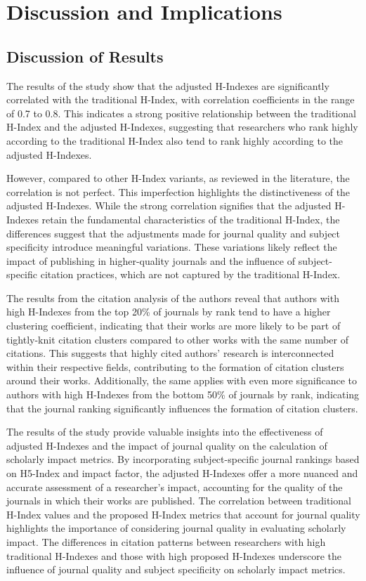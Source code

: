 \chapter{Discussion and Implications}
\label{ch:discussion}

\section{Discussion of Results}

The results of the study show that the adjusted H-Indexes are significantly
correlated with the traditional H-Index, with correlation coefficients in the
range of 0.7 to 0.8. This indicates a strong positive relationship between the
traditional H-Index and the adjusted H-Indexes, suggesting that researchers who
rank highly according to the traditional H-Index also tend to rank highly
according to the adjusted H-Indexes.

However, compared to other H-Index variants, as reviewed in the literature, the
correlation is not perfect. This imperfection highlights the distinctiveness of
the adjusted H-Indexes. While the strong correlation signifies that the
adjusted H-Indexes retain the fundamental characteristics of the traditional
H-Index, the differences suggest that the adjustments made for journal quality
and subject specificity introduce meaningful variations. These variations
likely reflect the impact of publishing in higher-quality journals and the
influence of subject-specific citation practices, which are not captured by the
traditional H-Index.

The results from the citation analysis of the authors reveal that authors with
high H-Indexes from the top 20\% of journals by rank tend to have a higher
clustering coefficient, indicating that their works are more likely to be part
of tightly-knit citation clusters compared to other works with the same number
of citations. This suggests that highly cited authors' research is
interconnected within their respective fields, contributing to the formation of
citation clusters around their works. Additionally, the same applies with even
more significance to authors with high H-Indexes from the bottom 50\% of
journals by rank, indicating that the journal ranking significantly influences
the formation of citation clusters.

The results of the study provide valuable insights into the effectiveness of
adjusted H-Indexes and the impact of journal quality on the calculation of
scholarly impact metrics. By incorporating subject-specific journal rankings
based on H5-Index and impact factor, the adjusted H-Indexes offer a more
nuanced and accurate assessment of a researcher's impact, accounting for the
quality of the journals in which their works are published. The correlation
between traditional H-Index values and the proposed H-Index metrics that
account for journal quality highlights the importance of considering journal
quality in evaluating scholarly impact. The differences in citation patterns
between researchers with high traditional H-Indexes and those with high
proposed H-Indexes underscore the influence of journal quality and subject
specificity on scholarly impact metrics.

